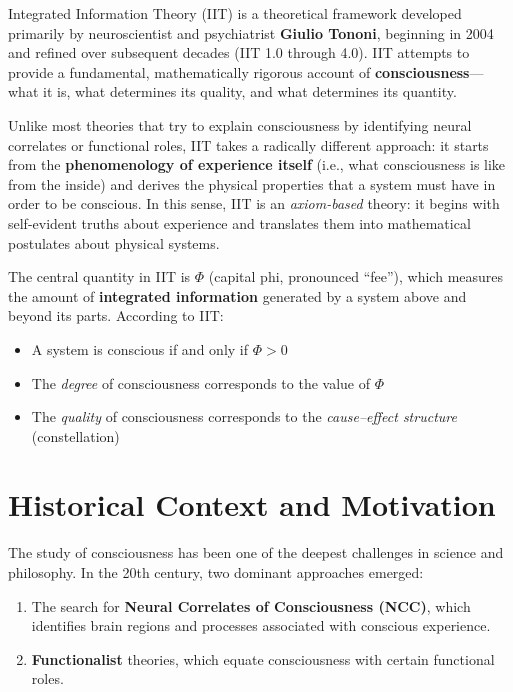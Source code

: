 \documentclass[11pt,a4paper]{report}
\newcommand{\Phi}{\varPhi}
\begin{document}
Integrated Information Theory (IIT) is a theoretical framework developed primarily by neuroscientist and psychiatrist \textbf{Giulio Tononi}, beginning in 2004 and refined over subsequent decades (IIT 1.0 through 4.0). IIT attempts to provide a fundamental, mathematically rigorous account of \textbf{consciousness}---what it is, what determines its quality, and what determines its quantity.

Unlike most theories that try to explain consciousness by identifying neural correlates or functional roles, IIT takes a radically different approach: it starts from the \textbf{phenomenology of experience itself} (i.e., what consciousness is like from the inside) and derives the physical properties that a system must have in order to be conscious. In this sense, IIT is an \emph{axiom-based} theory: it begins with self-evident truths about experience and translates them into mathematical postulates about physical systems.

\begin{definitionbox}[Central Quantity: $\Phi$]
The central quantity in IIT is $\Phi$ (capital phi, pronounced ``fee''), which measures the amount of \textbf{integrated information} generated by a system above and beyond its parts. According to IIT:
\begin{itemize}[leftmargin=1.5em]
  \item A system is conscious if and only if $\Phi > 0$
  \item The \emph{degree} of consciousness corresponds to the value of $\Phi$
  \item The \emph{quality} of consciousness corresponds to the \emph{cause--effect structure} (constellation)
\end{itemize}
\end{definitionbox}

\section{Historical Context and Motivation}

The study of consciousness has been one of the deepest challenges in science and philosophy. In the 20th century, two dominant approaches emerged:
\begin{enumerate}[leftmargin=2em]
  \item The search for \textbf{Neural Correlates of Consciousness (NCC)}, which identifies brain regions and processes associated with conscious experience.
  \item \textbf{Functionalist} theories, which equate consciousness with certain functional roles.
\end{enumerate}
\end{document}
